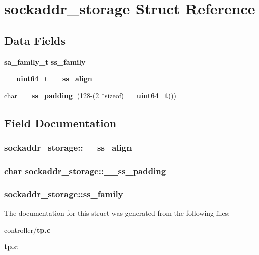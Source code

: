 \section{sockaddr\_\-storage Struct Reference}
\label{structsockaddr__storage}
\subsection*{Data Fields}
\begin{DoxyCompactItemize}
\item 
{\bf sa\_\-family\_\-t} {\bf ss\_\-family}
\item 
{\bf \_\-\_\-uint64\_\-t} {\bf \_\-\_\-ss\_\-align}
\item 
char {\bf \_\-\_\-ss\_\-padding} [(128-\/(2 $\ast$sizeof({\bf \_\-\_\-uint64\_\-t})))]
\end{DoxyCompactItemize}


\subsection{Field Documentation}
\subsubsection[{\_\-\_\-ss\_\-align}]{ {\bf sockaddr\_\-storage::\_\-\_\-ss\_\-align}}\label{structsockaddr__storage_a7bda5ca3436a0a50b9b35e8ed396048b}
\subsubsection[{\_\-\_\-ss\_\-padding}]{\setlength{\rightskip}{0pt plus 5cm}char {\bf sockaddr\_\-storage::\_\-\_\-ss\_\-padding}}\label{structsockaddr__storage_a30e02c4ab91fe1f70b468fe5d88d9a79}
\subsubsection[{ss\_\-family}]{ {\bf sockaddr\_\-storage::ss\_\-family}}\label{structsockaddr__storage_a0c5a3471dd6b0ae1c1b6e48de189fd8c}


The documentation for this struct was generated from the following files:\begin{DoxyCompactItemize}
\item 
controller/{\bf tp.c}\item 
{\bf tp.c}\end{DoxyCompactItemize}
